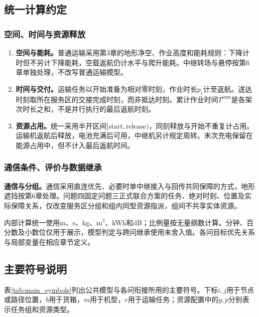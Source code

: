 \documentclass[withoutpreface,colorprint]{format}
\numberwithin{equation}{section}
\numberwithin{figure}{section}
\numberwithin{table}{section}
\begin{document}
\subsection{统一计算约定}
\subsubsection{空间、时间与资源释放}
\begin{enumerate}[label=(\arabic*),leftmargin=3.0em]
\item \textbf{空间与能耗。}普通运输采用第3章的地形净空、作业高度和能耗规则：下降计时但不另计下降能耗，空载返航仍计水平与爬升能耗。中继转场与悬停按第6章单独处理，不改写普通运输模型。
\item \textbf{时间与交付。}运输任务以开始准备为相对零时刻，作业时长$p_r$计至返航。送达时刻取所在服务区的交接完成时刻，而非抵达时刻。累计作业时间$T^{\mathrm{sum}}$是各架次时长之和，不是并行执行的最后返航时刻。
\item \textbf{资源占用。}统一采用半开区间$[\mathrm{start},\mathrm{release})$，同刻释放与开始不重复计占用。运输机返航后释放，电池充满后可用，中继机另计规定周转。末次充电保留在能源占用中，但不计入最后返航时间。
\end{enumerate}
\subsubsection{通信条件、评价与数据继承}
\noindent\textbf{通信与分组。}通信采用直连优先、必要时单中继接入与回传共同保障的方式，地形遮挡按第6章处理。问题四固定问题三正式联合方案的任务、绝对时刻、位置及实际保障关系，仅改变服务区分组和组内同型资源指派，组间不共享实体资源。

内部计算统一使用m、s、kg、m$^3$、kWh和dB；比例量按无量纲数计算。分钟、百分数及小数位仅用于展示，模型判定与跨问继承使用未舍入值。各问目标优先关系与局部变量在相应章节定义。

\subsection{主要符号说明}

表\ref{tab:main_symbols}列出公共模型与各问衔接所用的主要符号。下标$i,j$用于节点或路径位置，$b$用于货箱，$m$用于机型，$r$用于运输任务；资源配置中的$g,p$分别表示任务组和资源类型。
\end{document}
